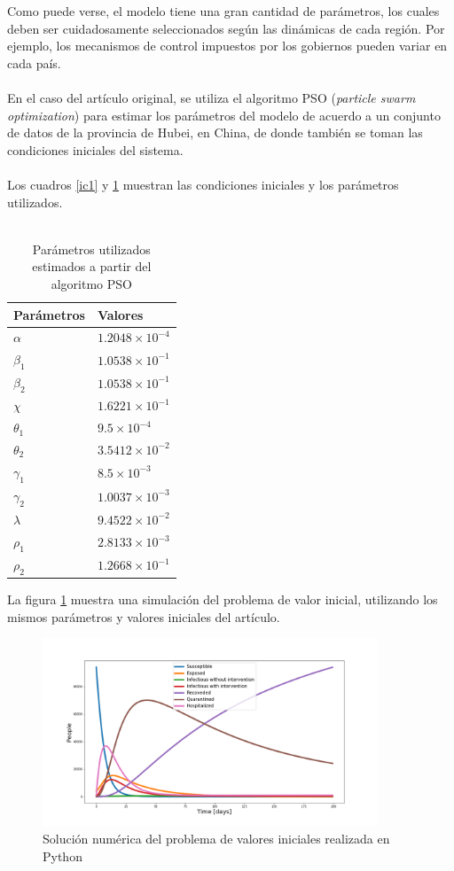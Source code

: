 \documentclass[conference]{IEEEtran}
\begin{document}
Como puede verse, el modelo tiene una gran cantidad de parámetros, los cuales deben
ser cuidadosamente seleccionados según las dinámicas de cada región. Por ejemplo, los 
mecanismos de control impuestos por los gobiernos pueden variar en cada país.
\\\\
En el caso del artículo original, se utiliza el algoritmo PSO (\textit{particle swarm optimization})
para estimar los parámetros del modelo de acuerdo a un conjunto de datos de la provincia
de Hubei, en China, de donde también se toman las condiciones iniciales del sistema.
\\\\
Los cuadros \ref{ic1} y \ref{p1} muestran las condiciones iniciales y los parámetros
utilizados.
\\\\
\begin{table}[h]
    \centering
    \begin{tabular}{ll}
    \hline
    Parámetros  & Valores                 \\ \hline
    $\alpha$    & $1.2048 \times 10^{-4}$ \\ 
    $\beta_1$   & $1.0538 \times 10^{-1}$ \\ 
    $\beta_2$   & $1.0538 \times 10^{-1}$ \\ 
    $\chi$      & $1.6221 \times 10^{-1}$ \\ 
    $\theta_1 $ & $9.5 \times 10^{-4}$    \\ 
    $\theta_2$  & $3.5412 \times 10^{-2}$ \\ 
    $\gamma_1$  & $8.5 \times 10^{-3}$    \\ 
    $\gamma_2$  & $1.0037 \times 10^{-3}$ \\ 
    $\lambda$   & $9.4522 \times 10^{-2}$ \\ 
    $\rho_1 $   & $2.8133 \times 10^{-3}$ \\ 
    $\rho_2$    & $1.2668 \times 10^{-1}$ \\ \hline
    \end{tabular}
    \caption{Parámetros utilizados estimados a partir del algoritmo PSO}
    \label{p1}
    \end{table}
La figura \ref{pvi_1} muestra una simulación del problema de valor inicial, utilizando
los mismos parámetros y valores iniciales del artículo.

\begin{figure}[h]
    \centering
    \includegraphics[width=10cm]{../Figures/ivp_1.png}
    \caption{Solución numérica del problema de valores iniciales realizada en Python}
    \label{pvi_1}
\end{figure}
\end{document}
